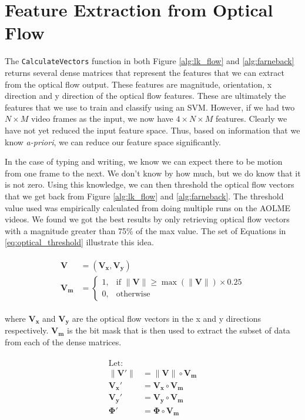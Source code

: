 \section{\label{section:feature_extraction}Feature Extraction from Optical Flow}
The \texttt{CalculateVectors} function in both Figure \ref{alg:lk_flow} and
\ref{alg:farneback} returns several dense matrices that represent the features
that we can extract from the optical flow output. These features are magnitude,
orientation, x direction and y direction of the optical flow features. These are
ultimately the features that we use to train and classify using an SVM. However,
if we had two $N \times M$ video frames as the input, we now have $4 \times N
\times M$ features. Clearly we have not yet reduced the input feature space.
Thus, based on information that we know \textit{a-priori}, we can reduce our
feature space significantly.

In the case of typing and writing, we know we can expect there to be motion from
one frame to the next. We don't know by how much, but we do know that it is not
zero. Using this knowledge, we can then threshold the optical flow vectors that
we get back from Figure \ref{alg:lk_flow} and \ref{alg:farneback}. The
threshold value used was empirically calculated from doing multiple runs on the
AOLME videos. We found we got the best results by only retrieving
optical flow vectors with a magnitude greater than 75\% of the max value. The set
of Equations in \ref{eq:optical_threshold} illustrate this idea.

\begin{align}
  \begin{split}
  \mathbf{V} &= (\mathbf{V_x}, \mathbf{V_y}) \\
  \mathbf{V_m} &=
  \begin{cases}
    1, & \text{if } \|\mathbf{V}\| \geq \max( \|\mathbf{V}\|) \times 0.25 \\
    0, & \text{otherwise}
  \end{cases}
  \end{split}
  \label{eq:optical_threshold}
\end{align}

where $\mathbf{V_x}$ and $\mathbf{V_y}$ are the optical flow vectors in the
x and y directions respectively. $\mathbf{V_m}$ is the bit mask that is
then used to extract the subset of data from each of the dense matrices.

\begin{align}
  \begin{split}
  \text{Let: } \\
  \|\mathbf{V\prime}\| &= \|\mathbf{V}\| \circ \mathbf{V_m}\\
  \mathbf{V_x\prime} &= \mathbf{V_x} \circ \mathbf{V_m}\\
  \mathbf{V_y\prime} &= \mathbf{V_y} \circ \mathbf{V_m}\\
  \mathbf{\Phi\prime} &= \mathbf{\Phi} \circ \mathbf{V_m}
\end{split}
\label{eq:subset}
\end{align}

